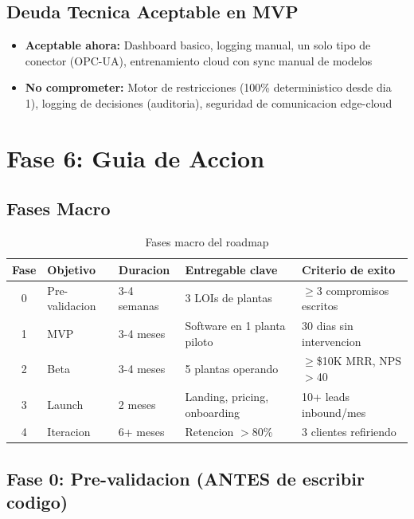 \documentclass[11pt,a4paper]{article}
\begin{document}
\subsection{Deuda Tecnica Aceptable en MVP}

\begin{itemize}[leftmargin=*]
    \item[\ding{51}] \textbf{Aceptable ahora:} Dashboard basico, logging manual, un solo tipo de conector (OPC-UA), entrenamiento cloud con sync manual de modelos
    \item[\ding{55}] \textbf{No comprometer:} Motor de restricciones (100\% deterministico desde dia 1), logging de decisiones (auditoria), seguridad de comunicacion edge-cloud
\end{itemize}

\newpage
\section{Fase 6: Guia de Accion}

\subsection{Fases Macro}

\begin{table}[h]
\centering
\small
\begin{tabular}{c p{2.5cm} p{2cm} p{3.5cm} p{3.5cm}}
\toprule
\textbf{Fase} & \textbf{Objetivo} & \textbf{Duracion} & \textbf{Entregable clave} & \textbf{Criterio de exito} \\
\midrule
0 & Pre-validacion & 3-4 semanas & 3 LOIs de plantas & $\geq$3 compromisos escritos \\
1 & MVP & 3-4 meses & Software en 1 planta piloto & 30 dias sin intervencion \\
2 & Beta & 3-4 meses & 5 plantas operando & $\geq$\$10K MRR, NPS $>$40 \\
3 & Launch & 2 meses & Landing, pricing, onboarding & 10+ leads inbound/mes \\
4 & Iteracion & 6+ meses & Retencion $>$80\% & 3 clientes refiriendo \\
\bottomrule
\end{tabular}
\caption{Fases macro del roadmap}
\end{table}

\subsection{Fase 0: Pre-validacion (ANTES de escribir codigo)}
\end{document}
